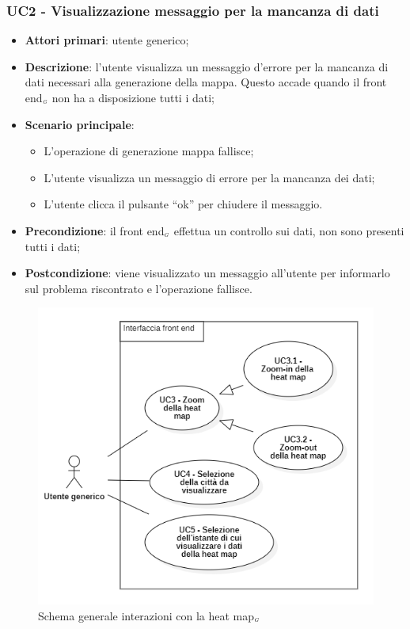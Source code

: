 \subsubsection{UC2 - Visualizzazione messaggio per la mancanza di dati }\label{CasiDUsoCasiDUsoTraUnUtenteEIlFrontEndElencoCasiDUsoUC2VisualizzazioneMessaggioPerLaMancanzaDiDati} %
\begin{itemize}
	\item \textbf{Attori primari}: utente generico;
	\item \textbf{Descrizione}: l’utente visualizza un messaggio d’errore per la mancanza di dati necessari alla generazione della mappa. Questo accade quando il front end$_{\scaleto{G}{3pt}}$ non ha a disposizione tutti i dati;
	\item \textbf{Scenario principale}:
	\begin{itemize}
		\item L’operazione di generazione mappa fallisce;
		\item L’utente visualizza un messaggio di errore per la mancanza dei dati;
		\item L’utente clicca il pulsante “ok” per chiudere il messaggio.
	\end{itemize}
	\item \textbf{Precondizione}: il front end$_{\scaleto{G}{3pt}}$ effettua un controllo sui dati, non sono presenti tutti i dati;
	\item \textbf{Postcondizione}: viene visualizzato un messaggio all’utente per informarlo sul problema riscontrato e l’operazione fallisce.
\end{itemize}


\begin{center}
	\begin{figure}[H]
		\centering\includegraphics[scale=0.8]{../immagini/attori_casi/UC3-4-5.png}
		\caption{Schema generale interazioni con la heat map$_{\scaleto{G}{3pt}}$}
	\end{figure}
\end{center}


